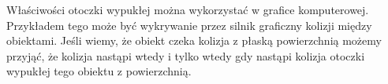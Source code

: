 \begin{center}
    \begin{Huge}
        \fontsize{46pt}{46pt}\selectfont{Zastosowania}
    \end{Huge}   
\end{center}
\begin{LARGE}
    Właściwości otoczki wypukłej można wykorzystać w grafice komputerowej. 
    Przykładem tego może być wykrywanie przez silnik graficzny kolizji między obiektami.
    Jeśli wiemy, że obiekt czeka kolizja z płaską powierzchnią możemy przyjąć,
    że kolizja nastąpi wtedy i tylko wtedy gdy nastąpi kolizja otoczki wypukłej tego obiektu z powierzchnią.
\end{LARGE}